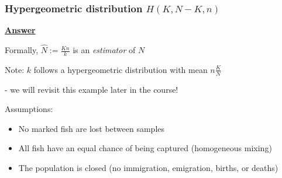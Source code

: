 \documentclass[t,8pt]{beamer}%
\begin{document}
        \begin{frame}
	\frametitle{Hypergeometric distribution $H(K,N-K,n)$}
        {\bf\underline{Answer}} \par
        Formally, $\hat N:=\frac{Kn}k$ is an {\it estimator} of $N$ \par
        Note: $k$ follows a hypergeometric distribution with mean $n\frac KN$ \par
        - we will revisit this example later in the course! \par
        Assumptions:
        \begin{itemize}
            \item No marked fish are lost between samples
            \item All fish have an equal chance of being captured (homogeneous mixing)
            \item The population is closed (no immigration, emigration, births, or deaths)
        \end{itemize}
    \end{frame}

	
\end{document}
